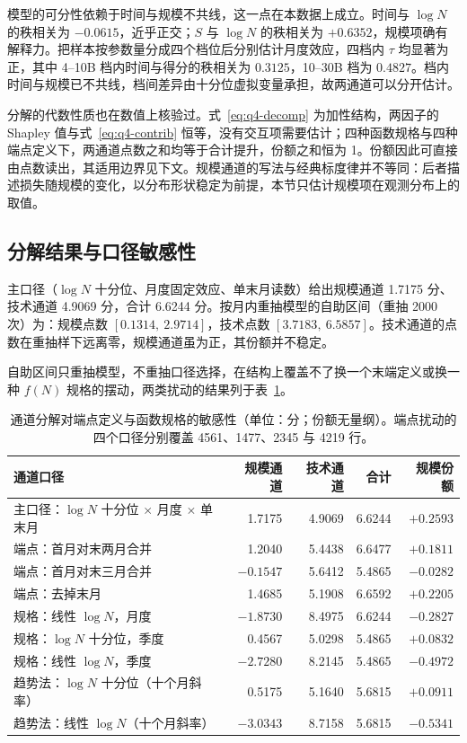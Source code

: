 模型的可分性依赖于时间与规模不共线，这一点在本数据上成立。时间与 $\log N$ 的秩相关为 $-0.0615$，近乎正交；$S$ 与 $\log N$ 的秩相关为 $+0.6352$，规模项确有解释力。把样本按参数量分成四个档位后分别估计月度效应，四档内 $\tau$ 均显著为正，其中 4--10B 档内时间与得分的秩相关为 $0.3125$，10--30B 档为 $0.4827$。档内时间与规模已不共线，档间差异由十分位虚拟变量承担，故两通道可以分开估计。

分解的代数性质也在数值上核验过。式~\eqref{eq:q4-decomp} 为加性结构，两因子的 Shapley 值与式~\eqref{eq:q4-contrib} 恒等，没有交互项需要估计；四种函数规格与四种端点定义下，两通道点数之和均等于合计提升，份额之和恒为 1。份额因此可直接由点数读出，其适用边界见下文。规模通道的写法与经典标度律并不等同：后者描述损失随规模的变化\citep{kaplan2020,hoffmann2022}，以分布形状稳定为前提\citep{bahri2024}，本节只估计规模项在观测分布上的取值。

\subsection{分解结果与口径敏感性}
\label{subsec:q4-perturb}

主口径（$\log N$ 十分位、月度固定效应、单末月读数）给出规模通道 1.7175 分、技术通道 4.9069 分，合计 6.6244 分。按月内重抽模型的自助区间（重抽 2000 次）为：规模点数 $[0.1314,\ 2.9714]$，技术点数 $[3.7183,\ 6.5857]$。技术通道的点数在重抽样下远离零，规模通道虽为正，其份额并不稳定。

自助区间只重抽模型，不重抽口径选择，在结构上覆盖不了换一个末端定义或换一种 $f(N)$ 规格的摆动，两类扰动的结果列于表~\ref{tab:q4-perturb}。

\begin{table}[H]
  \centering
  \caption{通道分解对端点定义与函数规格的敏感性（单位：分；份额无量纲）。端点扰动的四个口径分别覆盖 4561、1477、2345 与 4219 行。}
  \label{tab:q4-perturb}
  \begin{tabular}{@{}lrrrr@{}}
    \toprule
    通道口径 & 规模通道 & 技术通道 & 合计 & 规模份额 \\
    \midrule
    主口径：$\log N$ 十分位 $\times$ 月度 $\times$ 单末月 & 1.7175 & 4.9069 & 6.6244 & $+0.2593$ \\
    \midrule
    端点：首月对末两月合并 & 1.2040 & 5.4438 & 6.6477 & $+0.1811$ \\
    端点：首月对末三月合并 & $-0.1547$ & 5.6412 & 5.4865 & $-0.0282$ \\
    端点：去掉末月 & 1.4685 & 5.1908 & 6.6592 & $+0.2205$ \\
    \midrule
    规格：线性 $\log N$，月度 & $-1.8730$ & 8.4975 & 6.6244 & $-0.2827$ \\
    规格：$\log N$ 十分位，季度 & 0.4567 & 5.0298 & 5.4865 & $+0.0832$ \\
    规格：线性 $\log N$，季度 & $-2.7280$ & 8.2145 & 5.4865 & $-0.4972$ \\
    \midrule
    趋势法：$\log N$ 十分位（十个月斜率） & 0.5175 & 5.1640 & 5.6815 & $+0.0911$ \\
    趋势法：线性 $\log N$（十个月斜率） & $-3.0343$ & 8.7158 & 5.6815 & $-0.5341$ \\
    \bottomrule
  \end{tabular}
\end{table}

